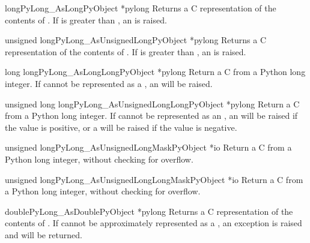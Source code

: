 \begin{cfuncdesc}{long}{PyLong_AsLong}{PyObject *pylong}
  Returns a C  representation of the contents of
  .  If  is greater than
  , an 
  is raised.
\end{cfuncdesc}

\begin{cfuncdesc}{unsigned long}{PyLong_AsUnsignedLong}{PyObject *pylong}
  Returns a C  representation of the contents of
  .  If  is greater than
  , an
   is raised.
\end{cfuncdesc}

\begin{cfuncdesc}{long long}{PyLong_AsLongLong}{PyObject *pylong}
  Return a C  from a Python long integer.  If
   cannot be represented as a , an
   will be raised.
\end{cfuncdesc}

\begin{cfuncdesc}{unsigned long long}{PyLong_AsUnsignedLongLong}{PyObject
                                                                 *pylong}
  Return a C  from a Python long integer.
  If  cannot be represented as an , an  will be raised if the value is
  positive, or a  will be raised if the value is
  negative.
\end{cfuncdesc}

\begin{cfuncdesc}{unsigned long}{PyLong_AsUnsignedLongMask}{PyObject *io}
  Return a C  from a Python long integer, without
  checking for overflow.
\end{cfuncdesc}

\begin{cfuncdesc}{unsigned long}{PyLong_AsUnsignedLongLongMask}{PyObject *io}
  Return a C  from a Python long integer, without
  checking for overflow.
\end{cfuncdesc}

\begin{cfuncdesc}{double}{PyLong_AsDouble}{PyObject *pylong}
  Returns a C  representation of the contents of
  .  If  cannot be approximately represented
  as a , an  exception is
  raised and  will be returned.
\end{cfuncdesc}

